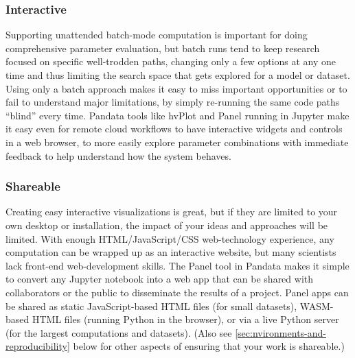 \subsubsection{Interactive}
Supporting unattended batch-mode computation is important for doing comprehensive parameter evaluation, but batch runs tend to keep research focused on specific well-trodden paths, changing only a few options at any one time and thus limiting the search space that gets explored for a model or dataset. Using only a batch approach makes it easy to miss important opportunities or to fail to understand major limitations, by simply re-running the same code paths ``blind'' every time. Pandata tools like hvPlot and Panel running in Jupyter make it easy even for remote cloud workflows to have interactive widgets and controls in a web browser, to more easily explore parameter combinations with immediate feedback to help understand how the system behaves.

\subsubsection{Shareable}
Creating easy interactive visualizations is great, but if they are limited to your own desktop or installation, the impact of your ideas and approaches will be limited. With enough HTML/JavaScript/CSS web-technology experience, any computation can be wrapped up as an interactive website, but many scientists lack front-end web-development skills. The Panel tool in Pandata makes it simple to convert any Jupyter notebook into a web app that can be shared with collaborators or the public to disseminate the results of a project. Panel apps can be shared as static JavaScript-based HTML files (for small datasets), WASM-based HTML files (running Python in the browser), or via a live Python server (for the largest computations and datasets). (Also see \autoref{sec:nvironments-and-reproducibility} below for other aspects of ensuring that your work is shareable.)

